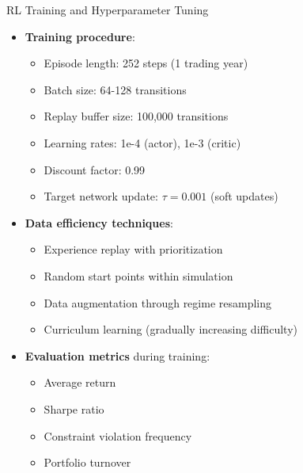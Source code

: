 \documentclass{beamer}
\begin{document}
\begin{frame}{RL Training and Hyperparameter Tuning}
\begin{itemize}
    \item \textbf{Training procedure}:
    \begin{itemize}
        \item Episode length: 252 steps (1 trading year)
        \item Batch size: 64-128 transitions
        \item Replay buffer size: 100,000 transitions
        \item Learning rates: 1e-4 (actor), 1e-3 (critic)
        \item Discount factor: 0.99
        \item Target network update: $\tau = 0.001$ (soft updates)
    \end{itemize}
    
    \item \textbf{Data efficiency techniques}:
    \begin{itemize}
        \item Experience replay with prioritization
        \item Random start points within simulation
        \item Data augmentation through regime resampling
        \item Curriculum learning (gradually increasing difficulty)
    \end{itemize}
    
    \item \textbf{Evaluation metrics} during training:
    \begin{itemize}
        \item Average return
        \item Sharpe ratio
        \item Constraint violation frequency
        \item Portfolio turnover
    \end{itemize}
\end{itemize}
\end{frame}
\end{document}
